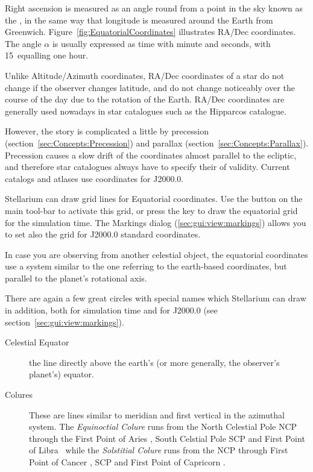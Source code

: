 Right ascension is measured as an angle round from a point in the sky
known as the , in the same way that
longitude is measured around the Earth from
Greenwich. Figure~\ref{fig:EquatorialCoordinates} illustrates RA/Dec
coordinates. The angle $\alpha$ is usually expressed as time with
minute and seconds, with 15\degree\ equalling one hour.

Unlike Altitude/Azimuth coordinates, RA/Dec coordinates of a star do
not change if the observer changes latitude, and do not change
noticeably over the course of the day due to the rotation of the
Earth.  RA/Dec coordinates are generally used nowadays in star
catalogues such as the Hipparcos catalogue.


However, the story is complicated a little by precession
(section~\ref{sec:Concepts:Precession}) and parallax
(section~\ref{sec:Concepts:Parallax}). Precession causes a slow drift
of the coordinates almost parallel to the ecliptic, and therefore star
catalogues always have to specify their  of
validity. Current catalogs and atlases use coordinates for J2000.0.


Stellarium can draw grid lines for Equatorial coordinates. Use the
button  on the main tool-bar to activate
this grid, or press the  key to draw the equatorial grid for
the simulation time. The Markings dialog (\ref{sec:gui:view:markings})
allows you to set also the grid for J2000.0 standard coordinates.

In case you are observing from another celestial object, the
equatorial coordinates use a system similar to the one referring to
the earth-based coordinates, but parallel to the planet's rotational
axis.

There are again a few great circles with special names which
Stellarium can draw in addition, both for simulation time and for
J2000.0 (see section~\ref{sec:gui:view:markings}).
\begin{description}
\item[Celestial Equator] the line directly above the earth's (or more
  generally, the observer's planet's) equator.
\item[Colures] These are lines similar to meridian and first vertical
  in the azimuthal system. The \emph{Equinoctial Colure} runs from the
  North Celestial Pole NCP through the First Point of Aries \Aries,
  South Celstial Pole SCP and First Point of Libra \Libra\, while the
  \emph{Solstitial Colure} runs from the NCP through First Point of
  Cancer \Cancer, SCP and First Point of Capricorn \Capricorn.
\end{description}

